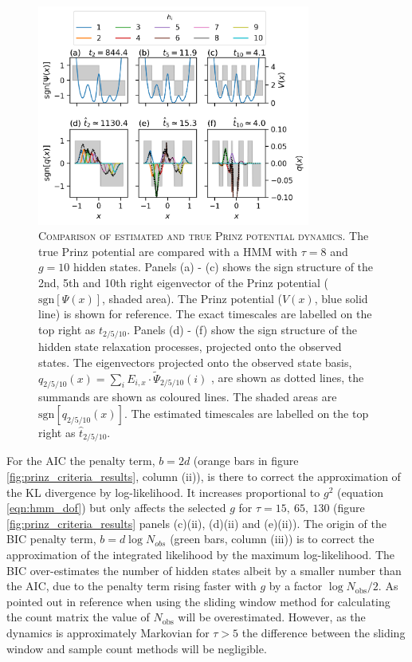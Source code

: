 \begin{figure}
    \centering
    \includegraphics[width=0.8\textwidth]{chapters/hmm_selection/figures/hmm_tau_8_g_10.png}
    \caption[Comparison of estimated and true Prinz potential dynamics]{\textsc{Comparison of estimated and true Prinz potential dynamics}. The true Prinz potential are compared with a HMM with $\tau=8$ and $g=10$ hidden states. Panels (a) - (c) shows the sign structure of the 2nd, 5th and 10th right eigenvector of the Prinz potential ($\mathrm{sgn}[\Psi(x)]$, shaded area). The Prinz potential ($V(x)$, blue solid line) is shown for reference. The exact timescales are labelled on the top right as $t_{2/5/10}$.  Panels (d) - (f) show the sign structure of the hidden state relaxation processes, projected onto the observed states. The eigenvectors projected onto the observed state basis, $q_{2/5/10}(x) = \sum_{i} E_{i, x} \cdot \tilde{\Psi}_{2/5/10}(i)$ , are shown as dotted lines, the summands are shown as coloured lines. The shaded areas are $\mathrm{sgn}[q_{2/5/10}(x)]$. The estimated timescales are labelled on the top right as $\hat{t}_{2/5/10}$. }
    \label{fig:prinz_tau8_g10}
\end{figure}

For the AIC the penalty term, $b=2d$ (orange bars in figure \ref{fig:prinz_criteria_results}, column (ii)), is there to correct the approximation of the KL divergence by log-likelihood. It increases proportional to $g^{2}$ (equation \ref{eqn:hmm_dof}) but only affects the selected $g$ for $\tau=15,\ 65,\ 130$ (figure \ref{fig:prinz_criteria_results} panels (c)(ii), (d)(ii) and (e)(ii)). The origin of the BIC penalty term, $b=d\log{N_{obs}}$ (green bars, column (iii)) is to correct the approximation of the integrated likelihood by the maximum log-likelihood. The BIC over-estimates the number of hidden states albeit by a smaller number than the AIC, due to the penalty term rising faster with $g$ by a factor $\log{N_{\mathrm{obs}}}/2$. As pointed out in reference \cite{mcgibbonStatisticalModelSelection2014a} when using the sliding window method for calculating the count matrix the value of $N_{\mathrm{obs}}$  will be overestimated. However, as the dynamics is approximately Markovian for $\tau > 5$ the difference between the sliding window and sample count methods will be negligible. 

